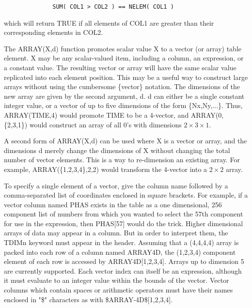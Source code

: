 \documentclass[11pt]{book}
\begin{document}
\begin{verbatim}
              SUM( COL1 > COL2 ) == NELEM( COL1 )
\end{verbatim}

    which will return TRUE if all elements  of  COL1  are  greater  than
    their corresponding elements in COL2.

    The ARRAY(X,d) function promotes scalar value X to a vector (or
    array) table element.  X may be any scalar-valued item, including
    a column, an expression, or a constant value.  The resulting
    vector or array will have the same scalar value replicated into
    each element position.  This may be a useful way to construct
    large arrays without using the cumbersome \{vector\} notation. The
    dimensions of the new array are given by the second argument, d.
    d can either be a single constant integer value, or a vector of up
    to five dimensions of the form \{Nx,Ny,...\}.  Thus, ARRAY(TIME,4)
    would promote TIME to be a 4-vector, and ARRAY(0, \{2,3,1\}) would
    construct an array of all 0's with dimensions $2\times 3\times 1$.

    A second form of ARRAY(X,d) can be used where X is a vector or
    array, and the dimensions d merely change the dimensions of X
    without changing the total number of vector elements.  This is a
    way to re-dimension an existing array.  For example,
    ARRAY(\{1,2,3,4\},{2,2}) would transform the 4-vector into a
    $2\times 2$ array.

    To  specify  a  single  element  of  a  vector, give the column name
    followed by  a  comma-separated  list  of  coordinates  enclosed  in
    square  brackets.  For example, if a vector column named PHAS exists
    in the table as a one dimensional, 256  component  list  of  numbers
    from  which  you  wanted to select the 57th component for use in the
    expression, then PHAS[57] would do the  trick.   Higher  dimensional
    arrays  of  data  may appear in a column.  But in order to interpret
    them, the TDIMn keyword must appear in the header.  Assuming that  a
    (4,4,4,4)  array  is packed into each row of a column named ARRAY4D,
    the  (1,2,3,4)  component  element  of  each  row  is  accessed   by
    ARRAY4D[1,2,3,4].    Arrays   up   to   dimension  5  are  currently
    supported.  Each vector index can itself be an expression,  although
    it  must  evaluate  to  an  integer  value  within the bounds of the
    vector.  Vector columns which contain spaces or arithmetic operators
    must   have   their   names  enclosed  in  "\$"  characters  as  with
    \$ARRAY-4D\$[1,2,3,4].
\end{document}

